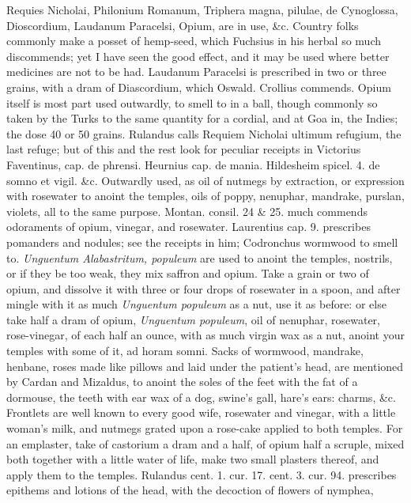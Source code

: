 Requies Nicholai, Philonium Romanum, Triphera magna, pilulae, de
Cynoglossa, Dioscordium, Laudanum Paracelsi, Opium, are in use, \&c.
Country folks commonly make a posset of hemp-seed, which Fuchsius in
his herbal so much discommends; yet I have seen the good effect, and it
may be used where better medicines are not to be had.
Laudanum Paracelsi is prescribed in two or three grains, with a dram of
Diascordium, which Oswald. Crollius commends. Opium itself is most part
used outwardly, to smell to in a ball, though commonly so taken by the
Turks to the same quantity for a cordial, and at Goa in, the
Indies; the dose 40 or 50 grains.
Rulandus calls Requiem Nicholai ultimum refugium, the last refuge; but
of this and the rest look for peculiar receipts in Victorius
Faventinus, cap. de phrensi. Heurnius cap. de mania. Hildesheim spicel.
4. de somno et vigil. \&c. Outwardly used, as oil of nutmegs by
extraction, or expression with rosewater to anoint the temples, oils of
poppy, nenuphar, mandrake, purslan, violets, all to the same purpose.
Montan. consil. 24 \& 25. much commends odoraments of opium, vinegar,
and rosewater. Laurentius cap. 9. prescribes pomanders and nodules; see
the receipts in him; Codronchus wormwood to smell to.
\emph{Unguentum Alabastritum, populeum} are used to anoint the temples,
nostrils, or if they be too weak, they mix saffron and opium. Take a
grain or two of opium, and dissolve it with three or four drops of
rosewater in a spoon, and after mingle with it as much \emph{Unguentum
populeum} as a nut, use it as before: or else take half a dram of
opium, \emph{Unguentum populeum}, oil of nenuphar, rosewater, rose-vinegar,
of each half an ounce, with as much virgin wax as a nut, anoint your
temples with some of it, ad horam somni.
Sacks of wormwood, mandrake, henbane, roses made like
pillows and laid under the patient's head, are mentioned by
Cardan and Mizaldus, to anoint the soles of the feet with the fat
of a dormouse, the teeth with ear wax of a dog, swine's gall, hare's
ears: charms, \&c.
Frontlets are well known to every good wife, rosewater and vinegar,
with a little woman's milk, and nutmegs grated upon a rose-cake applied
to both temples.
For an emplaster, take of castorium a dram and a half, of opium half a
scruple, mixed both together with a little water of life, make two
small plasters thereof, and apply them to the temples.
Rulandus cent. 1. cur. 17. cent. 3. cur. 94. prescribes epithems and
lotions of the head, with the decoction of flowers of nymphea,
